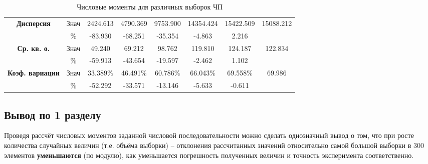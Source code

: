 \begin{table}[h]
{\begin{tabular}{|c|c|c|c|c|c|c|c|}
			\hline
			\multirow{2}{*}{\textbf{Дисперсия}}        & Знач & 2424.613                                                   & 4790.369    & 9753.900    & 14354.424    & 15422.509    & \multirow{2}{*}{15088.212} \\
			\cline{2-7}
			                                           & $\%$ & -83.930                                                    & -68.251     & -35.354     & -4.863       & 2.216        &                            \\
			\hline
			\multirow{2}{*}{\textbf{Ср. кв. о.}}       & Знач & 49.240                                                     & 69.212      & 98.762      & 119.810      & 124.187      & \multirow{2}{*}{122.834}   \\
			\cline{2-7}
			                                           & $\%$ & -59.913                                                    & -43.654     & -19.597     & -2.462       & 1.102        &                            \\
			\hline
			\multirow{2}{*}{\textbf{Коэф. вариации}}   & Знач & 33.389\%                                                   & 46.491\%    & 60.786\%    & 66.043\%     & 69.558\%     & \multirow{2}{*}{69.986}    \\
			\cline{2-7}
			                                           & $\%$ & -52.292                                                    & -33.571     & -13.146     & -5.633       & -0.611       &                            \\
			\hline
		\end{tabular}}
	\caption{Числовые моменты для различных выборок ЧП}
\end{table}

\subsection{Вывод по 1 разделу}
Проведя рассчёт числовых моментов заданной числовой последовательности можно сделать однозначный вывод о том, что при росте количества случайных величин (т.е. объёма выборки) -- отклонения рассчитанных значений относительно самой большой выборки в 300 элементов \textbf{уменьшаются} (по модулю), как уменьшается погрешность полученных величин и точность эксперимента соответственно.
